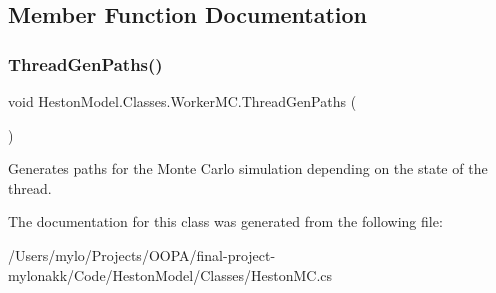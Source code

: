 \subsection{Member Function Documentation}
\mbox{\label{class_heston_model_1_1_classes_1_1_worker_m_c_a652df25340bf5f45727b3690e7c49c06}} 
\subsubsection{\texorpdfstring{Thread\+Gen\+Paths()}{ThreadGenPaths()}}
{\footnotesize\ttfamily void Heston\+Model.\+Classes.\+Worker\+M\+C.\+Thread\+Gen\+Paths (\begin{DoxyParamCaption}{ }\end{DoxyParamCaption})\hspace{0.3cm}{\ttfamily [inline]}}



Generates paths for the Monte Carlo simulation depending on the state of the thread. 



The documentation for this class was generated from the following file\+:\begin{DoxyCompactItemize}
\item 
/\+Users/mylo/\+Projects/\+O\+O\+P\+A/final-\/project-\/mylonakk/\+Code/\+Heston\+Model/\+Classes/Heston\+M\+C.\+cs\end{DoxyCompactItemize}
